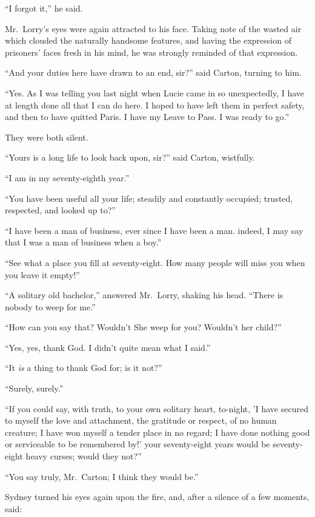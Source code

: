 ``I forgot it,'' he said.

Mr.\ Lorry's eyes were again attracted to his face.  Taking note of
the wasted air which clouded the naturally handsome features, and
having the expression of prisoners' faces fresh in his mind, he was
strongly reminded of that expression.

``And your duties here have drawn to an end, sir?'' said Carton,
turning to him.

``Yes.  As I was telling you last night when Lucie came in so
unexpectedly, I have at length done all that I can do here.  I hoped
to have left them in perfect safety, and then to have quitted Paris.
I have my Leave to Pass.  I was ready to go.''

They were both silent.

``Yours is a long life to look back upon, sir?'' said Carton, wistfully.

``I am in my seventy-eighth year.''

``You have been useful all your life; steadily and constantly occupied;
trusted, respected, and looked up to?''

``I have been a man of business, ever since I have been a man.
indeed, I may say that I was a man of business when a boy.''

``See what a place you fill at seventy-eight.  How many people will
miss you when you leave it empty!''

``A solitary old bachelor,'' answered Mr.\ Lorry, shaking his
head. ``There is nobody to weep for me.''

``How can you say that?  Wouldn't She weep for you?  Wouldn't her child?''

``Yes, yes, thank God.  I didn't quite mean what I said.''

``It \emph{is} a thing to thank God for; is it not?''

``Surely, surely.''

``If you could say, with truth, to your own solitary heart, to-night,
'I have secured to myself the love and attachment, the gratitude or
respect, of no human creature; I have won myself a tender place in no
regard; I have done nothing good or serviceable to be remembered by!'
your seventy-eight years would be seventy-eight heavy curses; would
they not?''

``You say truly, Mr.\ Carton; I think they would be.''

Sydney turned his eyes again upon the fire, and, after a silence of a
few moments, said:

